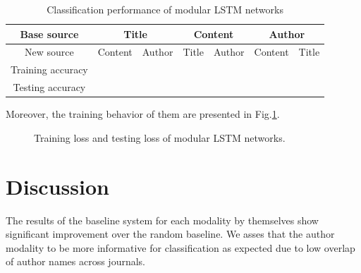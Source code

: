 \documentclass[12pt]{article}
\begin{document}
\begin{table}[!t]
\begin{center}
\caption{Classification performance of modular LSTM networks}
\label{modular_lstm_acc}
\begin{tabular}{c|cc|cc|cc}
\hline

Base source & \multicolumn{2}{c}{Title} & \multicolumn{2}{c}{Content} & \multicolumn{2}{c}{Author} \\
\hline
New source   &   Content   &   Author     &       Title  & Author                &            Content & Title \\
\hline
Training accuracy   &                   &                  &                &                           &                           & \\
Testing accuracy   &                   &                  &                &                           &                           & \\

\hline


\hline
\end{tabular}
\end{center}
\end{table}



Moreover, the training behavior of them are presented in Fig.\ref{training_loss_modular}.


\begin{figure}[!t]
\begin{center}
\end{center}
\caption{Training loss and testing loss of modular LSTM networks.}
\label{training_loss_modular}
\end{figure}










\section{Discussion}\label{discussion}
The results of the baseline system for each modality by themselves show significant improvement over the random baseline. We asses that the author modality to be more informative for classification as expected due to low overlap of author names across journals.
\end{document}
